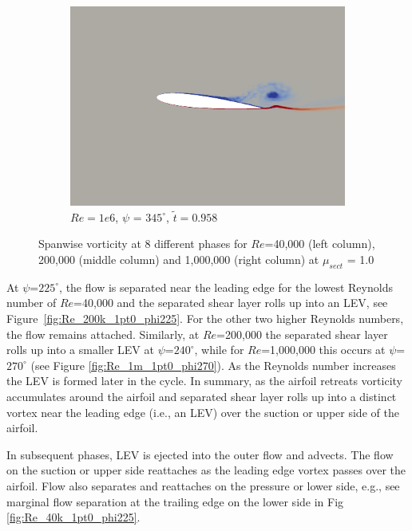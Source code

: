 \begin{figure}[H]
\begin{subfigure}[b]{0.32\textwidth}
		\includegraphics[width=1\textwidth]{figures/Vorticity_plots/Re_1m_1pt0/phase_345.png}
		\caption{$Re=1e6$, $\psi$ = $345^\circ$, $\tilde{t}=0.958$}
		\label{fig:Re_1m_1pt0_phi345}
	\end{subfigure}	
\caption{Spanwise vorticity at 8 different phases for $Re$=40,000 (left column), 200,000 (middle column) and 1,000,000 (right column) at $\mu_{sect}$ = 1.0}
\label{fig:vortScreen_1pt0}
\end{figure}


At $\psi$=$225^\circ$, the flow is separated near the leading edge for the lowest Reynolds number of $Re$=40,000 and the separated shear layer rolls up into an LEV, see Figure~\ref{fig:Re_200k_1pt0_phi225}.
For the other two higher Reynolds numbers, the flow remains attached.
Similarly, at $Re$=200,000 the separated shear layer rolls up into a smaller LEV at $\psi$=$240^\circ$, while for $Re$=1,000,000 this occurs at $\psi$=$270^\circ$ (see Figure \ref{fig:Re_1m_1pt0_phi270}).
As the Reynolds number increases the LEV is formed later in the cycle.
In summary, as the airfoil retreats vorticity accumulates around the airfoil and separated shear layer rolls up into a distinct vortex near the leading edge (i.e., an LEV) over the suction or upper side of the airfoil.

In subsequent phases, LEV is ejected into the outer flow and advects.
The flow on the suction or upper side reattaches as the leading edge vortex passes over the airfoil.
Flow also separates and reattaches on the pressure or lower side, e.g., see marginal flow separation at the trailing edge on the lower side in Fig \ref{fig:Re_40k_1pt0_phi225}.

